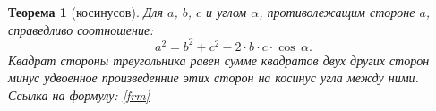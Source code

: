 \documentclass[a4paper]{article}
\newtheorem{theo}{Теорема}
\begin{document}
\begin{theo}[косинусов]
Для $a$, $b$, $c$ и углом $\alpha$, противолежащим стороне $a$, справедливо соотношение:
\begin{equation}\label{frm}
a^2 = b^2 + c^2 - 2 \cdot b \cdot c \cdot \cos\,\alpha.
\end{equation}
Квадрат стороны треугольника равен сумме квадратов двух других сторон минус удвоенное произведенние этих сторон на косинус угла между ними.
Ссылка на формулу: \ref{frm}
\end{theo}
\end{document}
